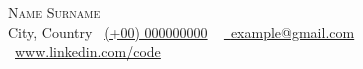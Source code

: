 
    {\Huge \scshape Name Surname} \\ \vspace{7pt}
    \faMapMarked* City, Country 
    \small \raisebox{-0.1\height}\faPhone\ \href{tel:00000000000}{(+00) 000000000} ~ \href{mailto:example@gmail.com}{\raisebox{-0.2\height}\faEnvelope\  {example@gmail.com}} ~ 
    \\ \vspace{3pt}
    \small \raisebox{-0.1\height}\faLinkedinIn\ \href{https://www.linkedin.com/in/code/}{www.linkedin.com/code}
    \vspace{6pt}